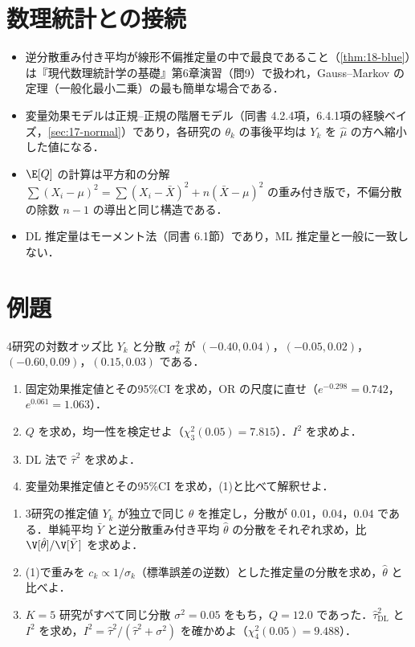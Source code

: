 \section{数理統計との接続}\label{sec:18-link}
\begin{linkbox}
\begin{itemize}
\item 逆分散重み付き平均が線形不偏推定量の中で最良であること（\cref{thm:18-blue}）は『現代数理統計学の基礎』第6章演習（問9）で扱われ，Gauss--Markov の定理（一般化最小二乗）の最も簡単な場合である．
\item 変量効果モデルは正規--正規の階層モデル（同書 4.2.4項，6.4.1項の経験ベイズ，\cref{sec:17-normal}）であり，各研究の $\theta_k$ の事後平均は $Y_k$ を $\hat\mu$ の方へ縮小した値になる．
\item $\E[Q]$ の計算は平方和の分解 $\sum(X_i-\mu)^2=\sum(X_i-\bar X)^2+n(\bar X-\mu)^2$ の重み付き版で，不偏分散の除数 $n-1$ の導出と同じ構造である．
\item DL 推定量はモーメント法（同書 6.1節）であり，ML 推定量と一般に一致しない．
\end{itemize}
\end{linkbox}

\section{例題}\label{sec:18-ex}
\begin{reidai}[固定効果と変量効果]\label{reidai:18-1}
4研究の対数オッズ比 $Y_k$ と分散 $\sigma_k^2$ が $(-0.40,0.04)$，$(-0.05,0.02)$，$(-0.60,0.09)$，$(0.15,0.03)$ である．
\begin{enumerate}[label=(\arabic*)]
\item 固定効果推定値とその95\%CI を求め，OR の尺度に直せ（$e^{-0.298}=0.742$，$e^{0.061}=1.063$）．
\item $Q$ を求め，均一性を検定せよ（$\chi^2_3(0.05)=7.815$）．$I^2$ を求めよ．
\item DL 法で $\hat\tau^2$ を求めよ．
\item 変量効果推定値とその95\%CI を求め，(1)と比べて解釈せよ．
\end{enumerate}
\end{reidai}

\begin{reidai}[逆分散重みの効率と等分散の場合]\label{reidai:18-2}
\begin{enumerate}[label=(\arabic*)]
\item 3研究の推定値 $Y_k$ が独立で同じ $\theta$ を推定し，分散が $0.01$，$0.04$，$0.04$ である．単純平均 $\bar Y$ と逆分散重み付き平均 $\hat\theta$ の分散をそれぞれ求め，比 $\V[\hat\theta]/\V[\bar Y]$ を求めよ．
\item (1)で重みを $c_k\propto1/\sigma_k$（標準誤差の逆数）とした推定量の分散を求め，$\hat\theta$ と比べよ．
\item $K=5$ 研究がすべて同じ分散 $\sigma^2=0.05$ をもち，$Q=12.0$ であった．$\hat\tau^2_{\mathrm{DL}}$ と $I^2$ を求め，$I^2=\hat\tau^2/(\hat\tau^2+\sigma^2)$ を確かめよ（$\chi^2_4(0.05)=9.488$）．
\end{enumerate}
\end{reidai}

